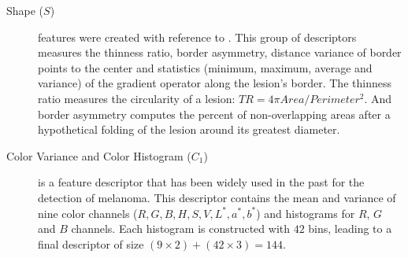 %	
%
\begin{description}
\item[Shape ($S$)] features were created with reference to \cite{maglogiannis2009overview}.
This group of descriptors measures the thinness ratio, border asymmetry, distance variance of border points to the center and statistics (minimum, maximum, average and variance) of the gradient operator along the lesion's border.
	The thinness ratio measures the circularity of a lesion: $TR = 4\pi Area / Perimeter^2$. 
	And border asymmetry computes the percent of non-overlapping areas after a hypothetical folding of the lesion around its greatest diameter. 
\item[Color Variance and Color Histogram ($C_{1}$)] is a feature descriptor that has been widely used in the past for the detection of melanoma.
This descriptor contains the mean and variance of nine color channels ($R,G,B, H,S,V, L^*,a^*,b^*$) and histograms for $R$, $G$ and $B$ channels.
Each histogram is constructed with $42$ bins, leading to a final descriptor of size $(9\times2)+(42\times3) = 144$.
\end{description}
